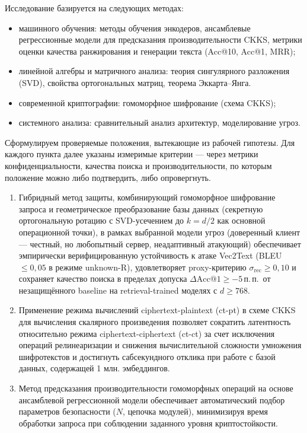 \documentclass[a4paper, 12pt, oneside, openany]{article}
\begin{document}
Исследование базируется на следующих методах:
\begin{itemize}
	\item
	машинного обучения: методы обучения энкодеров, ансамблевые регрессионные модели для предсказания производительности CKKS, метрики оценки качества ранжирования и генерации текста (Acc@10, Acc@1, MRR);
	\item
	линейной алгебры и матричного анализа: теория сингулярного разложения (SVD), свойства ортогональных матриц, теорема Эккарта--Янга. 

	\item
	современной криптографии: гомоморфное шифрование (схема CKKS);

	\item
	системного анализа: сравнительный анализ архитектур, моделирование угроз.
\end{itemize}

Сформулируем проверяемые положения, вытекающие из рабочей гипотезы. Для каждого пункта далее указаны измеримые критерии — через метрики конфиденциальности, качества поиска и производительности, по которым положение можно либо подтвердить, либо опровергнуть.

\begin{enumerate}
	\def\labelenumi{\arabic{enumi}.}
	\item
	Гибридный метод защиты, комбинирующий гомоморфное шифрование запроса и геометрическое преобразование базы данных (секретную ортогональную ротацию с SVD-усечением до $k = d/2$ как основной операционной точки), в рамках выбранной модели угроз (доверенный клиент --- честный, но любопытный сервер, неадаптивный атакующий) обеспечивает эмпирически верифицированную устойчивость к атаке Vec2Text (BLEU $\leq 0{,}05$ в режиме unknown-R), удовлетворяет proxy-критерию $\sigma_{\mathrm{rec}} \geq 0{,}10$ и сохраняет качество поиска в пределах допуска $\Delta\mathrm{Acc@1} \geq -5$\,п.\,п.\ от незащищённого baseline на retrieval-trained моделях с $d \geq 768$.
	\item
	Применение режима вычислений ciphertext-plaintext (ct-pt) в схеме CKKS для вычисления скалярного произведения позволяет сократить латентность относительно режима ciphertext-ciphertext (ct-ct) за счет исключения операций релинеаризации и снижения вычислительной сложности умножения шифротекстов и достигнуть сабсекундного отклика при работе с базой данных, содержащей 1 млн. эмбеддингов.
	\item
	Метод предсказания производительности гомоморфных операций на основе ансамблевой регрессионной модели обеспечивает автоматический подбор параметров безопасности ($N$, цепочка модулей), минимизируя время обработки запроса при соблюдении заданного уровня криптостойкости.
\end{enumerate}
\end{document}

